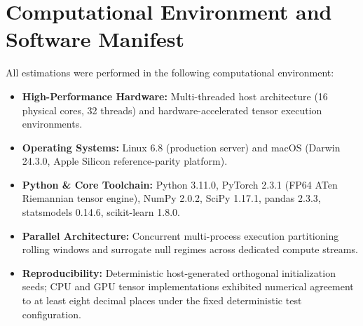 \documentclass[12pt]{article}
\begin{document}
\section{Computational Environment and Software Manifest}
\label{app:comp_env}

All estimations were performed in the following computational environment:
\begin{itemize}
    \item \textbf{High-Performance Hardware:} Multi-threaded host architecture (16 physical cores, 32 threads) and hardware-accelerated tensor execution environments.
    \item \textbf{Operating Systems:} Linux 6.8 (production server) and macOS (Darwin 24.3.0, Apple Silicon reference-parity platform).
    \item \textbf{Python \& Core Toolchain:} Python 3.11.0, PyTorch 2.3.1 (FP64 ATen Riemannian tensor engine), NumPy 2.0.2, SciPy 1.17.1, pandas 2.3.3, statsmodels 0.14.6, scikit-learn 1.8.0.
    \item \textbf{Parallel Architecture:} Concurrent multi-process execution partitioning rolling windows and surrogate null regimes across dedicated compute streams.
    \item \textbf{Reproducibility:} Deterministic host-generated orthogonal initialization seeds; CPU and GPU tensor implementations exhibited numerical agreement to at least eight decimal places under the fixed deterministic test configuration.
\end{itemize}
\end{document}
